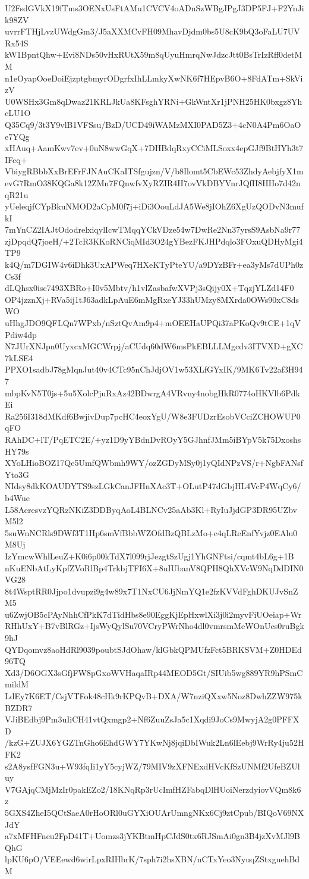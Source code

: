 U2FsdGVkX19fTms3OENxUsFtAMu1CVCV4oADnSzWBgJPgJ3DP5FJ+F2YnJik98ZV
uvrrFTHjLvzUWdgGm3/J5aXXMCvFH09MhavDjdm0bs5U8cK9bQ3oFaLU7UVRx54S
kW1BpntQhw+Evi8NDs50vHxRUtX59m8qUyuHmrqNwJdzcJtt0BsTrIzRff0detMM
n1eOyapOoeDoiEjzptgbmyrODgrfxIhLLmkyXwNK6f7HEpvB6O+8FdATm+SkVizV
U0WSHx3Gm8qDwaz21KRLJkUa8KFsghYRNi+GkWntXr1jPNH25HK0bxgz8YhcLU1O
Q35Cq9/3t3Y9vlB1VFSsu/BzD/UCD49iWAMzMXI0PAD5Z3+4cN0A4Pm6OaOe7YQg
xHAuq+AamKwv7ev+0uN8wwGqX+7DHBdqRxyCCiMLSoxx4epGJf9BtHYh3t7IFcq+
VbiygRBbbXxBrEFrFJNAuCKaITSfgujzn/V/b8Ilomt5CbEWc53ZhdyAebjfyX1m
evG7RmO38KQGa8k12ZMn7FQnwfvXyRZIR4H7ovVkDBYVnrJQfH8HHo7d42nqR21u
yUeleqjfCYpBkuNMOD2aCpM0f7j+iDi3OouLdJA5We8jIOhZ6XgUzQODvN3mufkI
7mYnCZ2IAJtOdodrelxiqylIcwTMqqYCkVDze54w7DwRe2Nn37yrsS9AsbNa9r77
zjDpqdQ7joeH/+2TcR3KKoRNCiqMId3O24gYBezFKJHPdqlo3FOxuQDHyMgi4TP9
k4Q/m7DGIW4v6iDhk3UxAPWeq7HXeKTyPteYU/a9DYzBFr+ea3yMs7dUPh0zCs3f
dLQhsx0isc7493XBRo+I0v5Mbtv/h1vlZasbafwXVPj3sQijy0X+TqzjYLZd14F0
OP4jzznXj+RVa5ij1tJ63adkLpAuE6mMgRxeYJ33hUMzy8MXrda0OWs90xC8dsWO
uHhgJDO9QFLQn7WPxb/nSztQvAm9p4+mOEEHaUPQi37aPKoQv9tCE+1qVPdiw4dp
N7JUrXNJpn0UyxcxMGCWrpj/aCUdq60dW6msPkEBLLLMgcdv3ITVXD+gXC7kLSE4
PPXO1sadbJ78gMqnJut40v4CTc95nChJdjOV1w53XLfGYxIK/9MK6Tv22af3H947
mbpKvN5T0js+5u5XolcPjuRxAz42BDwrgA4VRvny4nobgHkR0774oHKVlb6PdkEi
Ra256I318dMKdf6BwjivDup7pcHC4eoxYgU/W8e3FUDzrEsobVCciZCHOWUP0qFO
RAhDC+lT/PqETC2E/+yz1D9yYBdnDvROyY5GJhnfJMm5iBYpV5k75DxoshsHY79s
XYoLHioBOZ17Qe5UmfQWbmh9WY/ozZGDyMSy0j1yQIdNPzVS/r+NgbFANsfYto3G
NIdsy8dkKOAUDYTS9szLGkCanJFHnXAc3T+OLutP47dGbjHL4VcP4WqCy6/b4Wue
L58AeresvzYQRzNKiZ3DDByqAoL4BLNCv25aAb3Kl+RyIuJjdGP3DR95UZbvM5l2
5suWnNCRls9DWf3T1Hp6smVfBbbWZOfdBzQBLzMo+c4qLReEnfYvjz0EAlu0M8Uj
IzYmcwWhlLeuZ+K0i6p00kTdX7l099rjJezgtSzUgj1YhGNFtsi/cqmt4bL6g+1B
nKuENbAtLyKpfZVoRlBp4TrkbjTFI6X+8uIUbanV8QPH8QhXVcW9NqDdDIN0VG28
8t4WsptRR0Jjpo1dvupzi9g4w89x7T1NxCU6JjNmYQ1e2fzKVVdFghDKUJvSnZM5
u6ZwjOB5cPAyNhhCfPkK7dTidHbs8e90EggKjEpHxwlXi3j0i2myvFiUOeiap+Wr
RHhUxY+B7vBlRGz+IjsWyQylSu70VCryPWrNho4dl0vmrsmMeWOnUes0ruBgk9hJ
QYDqomvz8aoHdRl9039poubtSJdOhaw/klGbkQPMUfzFct5BRKSVM+Z0HDEd96TQ
Xd3/D6OGX3sGfjFW8pGxoWVHaqaIRp44MEOD5Gt/SIUib5wg889YR9hPSmCmildM
LdEy7K6ET/CsjVTFok48cHk9rKPQvB+DXA/W7nziQXxw5Noz8DwhZZW975kBZDR7
VJiBEdbj9Pm3uIiCH41vtQxmgp2+Nf6ZuuZsJa5c1Xqdi9JoCs9MwyjA2g0PFFXD
/kzG+ZUJX6YGZTnGho6EhdGWY7YKwNj8jqiDbIWuk2Ln6lEebj9WrRy4ju52HFK2
s2A8ysfFGN3u+W93fqIi1yY5cyjWZ/79MIV9zXFNExdHVcKfSzUNMf2UfeBZUluy
V7GAjqCMjMzIr0pakEZo2/18KNqRp3rUcImfHZFabqDlHUoiNerzdyiovVQm8k6z
5GXS4ZheI5QCtSaeA0rHoORl0uGYXiOUArUmngNKx6Cj9ztCpub/BIQoV69NXJdY
a7xMFHFneu2FpD41T+Uomzs3jYKBtmHpCJdS0tx6RJSmAi0gn3B4jzXvMJl9BQhG
lpKU6pO/VEEewd6wirLpxRIHbrK/7sph7i2hsXBN/nCTxYeo3NyuqZStxguehBdM
